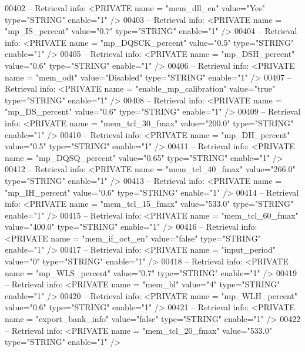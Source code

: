 \begin{DoxyCode}
{00402 \textcolor{keyword}{-- Retrieval info:      <PRIVATE name = "mem\_dll\_en" value="Yes"  type="STRING"  enable="1" />}
00403 \textcolor{keyword}{-- Retrieval info:      <PRIVATE name = "mp\_IS\_percent" value="0.7"  type="STRING"  enable="1" />}
00404 \textcolor{keyword}{-- Retrieval info:      <PRIVATE name = "mp\_DQSCK\_percent" value="0.5"  type="STRING"  enable="1" />}
00405 \textcolor{keyword}{-- Retrieval info:      <PRIVATE name = "mp\_DSH\_percent" value="0.6"  type="STRING"  enable="1" />}
00406 \textcolor{keyword}{-- Retrieval info:      <PRIVATE name = "mem\_odt" value="Disabled"  type="STRING"  enable="1" />}
00407 \textcolor{keyword}{-- Retrieval info:      <PRIVATE name = "enable\_mp\_calibration" value="true"  type="STRING"  enable="1" />}
00408 \textcolor{keyword}{-- Retrieval info:      <PRIVATE name = "mp\_DS\_percent" value="0.6"  type="STRING"  enable="1" />}
00409 \textcolor{keyword}{-- Retrieval info:      <PRIVATE name = "mem\_tcl\_30\_fmax" value="200.0"  type="STRING"  enable="1" />}
00410 \textcolor{keyword}{-- Retrieval info:      <PRIVATE name = "mp\_DH\_percent" value="0.5"  type="STRING"  enable="1" />}
00411 \textcolor{keyword}{-- Retrieval info:      <PRIVATE name = "mp\_DQSQ\_percent" value="0.65"  type="STRING"  enable="1" />}
00412 \textcolor{keyword}{-- Retrieval info:      <PRIVATE name = "mem\_tcl\_40\_fmax" value="266.0"  type="STRING"  enable="1" />}
00413 \textcolor{keyword}{-- Retrieval info:      <PRIVATE name = "mp\_IH\_percent" value="0.6"  type="STRING"  enable="1" />}
00414 \textcolor{keyword}{-- Retrieval info:      <PRIVATE name = "mem\_tcl\_15\_fmax" value="533.0"  type="STRING"  enable="1" />}
00415 \textcolor{keyword}{-- Retrieval info:      <PRIVATE name = "mem\_tcl\_60\_fmax" value="400.0"  type="STRING"  enable="1" />}
00416 \textcolor{keyword}{-- Retrieval info:      <PRIVATE name = "mem\_if\_oct\_en" value="false"  type="STRING"  enable="1" />}
00417 \textcolor{keyword}{-- Retrieval info:      <PRIVATE name = "input\_period" value="0"  type="STRING"  enable="1" />}
00418 \textcolor{keyword}{-- Retrieval info:      <PRIVATE name = "mp\_WLS\_percent" value="0.7"  type="STRING"  enable="1" />}
00419 \textcolor{keyword}{-- Retrieval info:      <PRIVATE name = "mem\_bl" value="4"  type="STRING"  enable="1" />}
00420 \textcolor{keyword}{-- Retrieval info:      <PRIVATE name = "mp\_WLH\_percent" value="0.6"  type="STRING"  enable="1" />}
00421 \textcolor{keyword}{-- Retrieval info:      <PRIVATE name = "export\_bank\_info" value="false"  type="STRING"  enable="1" />}
00422 \textcolor{keyword}{-- Retrieval info:      <PRIVATE name = "mem\_tcl\_20\_fmax" value="533.0"  type="STRING"  enable="1" />}
}
\end{DoxyCode}
